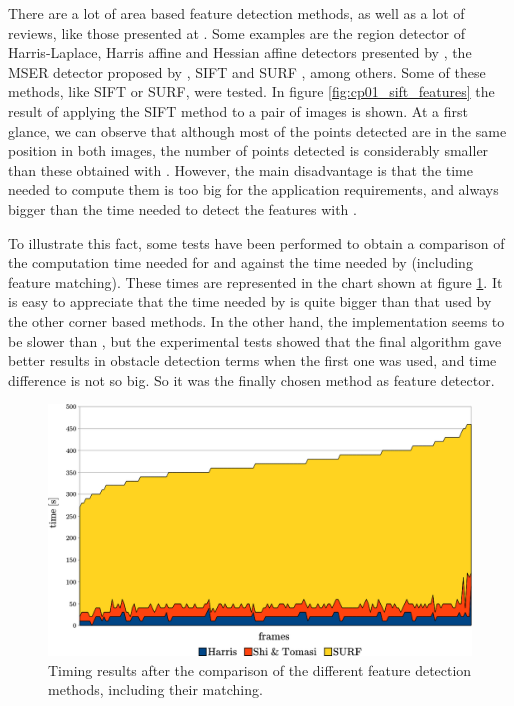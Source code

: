 There are a lot of area based feature detection methods, as well as a lot of reviews, like those presented at \cite{mikolajczyk2005comparison, li2008comprehensive}. Some examples are the region detector of Harris-Laplace, Harris affine and Hessian affine detectors presented by \cite{mikolajczyk2004scale}, the MSER detector proposed by \cite{matas2004robust}, SIFT \citep{lowe1999object} and SURF \citep{bay2008speeded}, among others. Some of these methods, like SIFT or SURF, were tested. In figure \ref{fig:cp01_sift_features} the result of applying the SIFT method to a pair of images is shown. At a first glance, we can observe that although most of the points detected are in the same position in both images, the number of points detected is considerably smaller than these obtained with \cite{shi1994good}. However, the main disadvantage is that the time needed to compute them is too big for the application requirements, and always bigger than the time needed to detect the features with \cite{shi1994good}.

To illustrate this fact, some tests have been performed to obtain a comparison of the computation time needed for \cite{harris1988combined} and \cite{shi1994good} against the time needed by \cite{bay2008speeded} (including feature matching). These times are represented in the chart shown at figure \ref{fig:cp01_features_time_comparison}. It is easy to appreciate that the time needed by \cite{bay2008speeded} is quite bigger than that used by the other corner based methods. In the other hand, the \cite{shi1994good} implementation seems to be slower than \cite{harris1988combined}, but the experimental tests showed that the final algorithm gave better results in obstacle detection terms when the first one was used, and time difference is not so big. So it was the finally chosen method as feature detector.

\begin{figure}[h!]
\centering
\includegraphics{featuresTimeComparison}
\caption{Timing results after the comparison of the different feature detection methods, including their matching.}\label{fig:cp01_features_time_comparison}
\end{figure}

